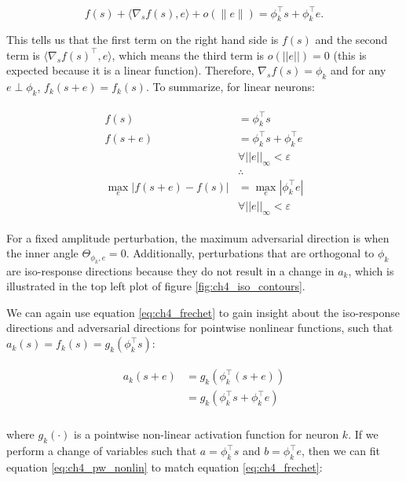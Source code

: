 \begin{equation}
    f(s) + \langle\nabla_{s}f(s), e\rangle + o(\|e\|) = \phi_{k}^\top s + \phi_{k}^\top e.
\end{equation}

This tells us that the first term on the right hand side is $f(s)$ and the second term is $\langle\nabla_{s}f(s)^\top, e\rangle$, which means the third term is $o(||e||)=0$ (this is expected because it is a linear function). Therefore,  $\nabla_{s}f(s) = \phi_{k}$ and for any $e \perp \phi_{k}$, $f_{k}(s+e) = f_{k}(s)$. To summarize, for linear neurons:

\begin{align}\label{eq:parallel_adv_proof}
\begin{split}
    f(s) &= \phi_{k}^\top s \\
    f(s+e) &= \phi_{k}^\top s + \phi_{k}^\top e \\
    &\forall ||e||_{\infty} < \varepsilon \\
    &\therefore \\
    \max_{e} | f(s+e) - f(s) | &= \max_{e} | \phi_{k}^\top e | \\
    & \forall ||e||_{\infty} < \varepsilon
\end{split}
\end{align}

For a fixed amplitude perturbation, the maximum adversarial direction is when the inner angle $\Theta_{\phi_{k},e} = 0$. Additionally, perturbations that are orthogonal to $\phi_{k}$ are iso-response directions because they do not result in a change in $a_{k}$, which is illustrated in the top left plot of figure \ref{fig:ch4_iso_contours}.

We can again use equation \eqref{eq:ch4_frechet} to gain insight about the iso-response directions and adversarial directions for pointwise nonlinear functions, such that $a_{k}(s) = f_{k}(s) = g_{k}(\phi_{k}^\top s)$:

\begin{align}\label{eq:ch4_pw_nonlin}
\begin{split}
  a_{k}(s+e) &= g_{k}(\phi_{k}^\top(s+e)) \\
  &=g_{k}(\phi_{k}^\top s + \phi_{k}^\top e) \\
\end{split}
\end{align}

where $g_{k}(\cdot)$ is a pointwise non-linear activation function for neuron $k$. If we perform a change of variables such that $a = \phi_{k}^\top s$ and $b = \phi_{k}^\top e$, then we can fit equation \eqref{eq:ch4_pw_nonlin} to match equation \eqref{eq:ch4_frechet}:

